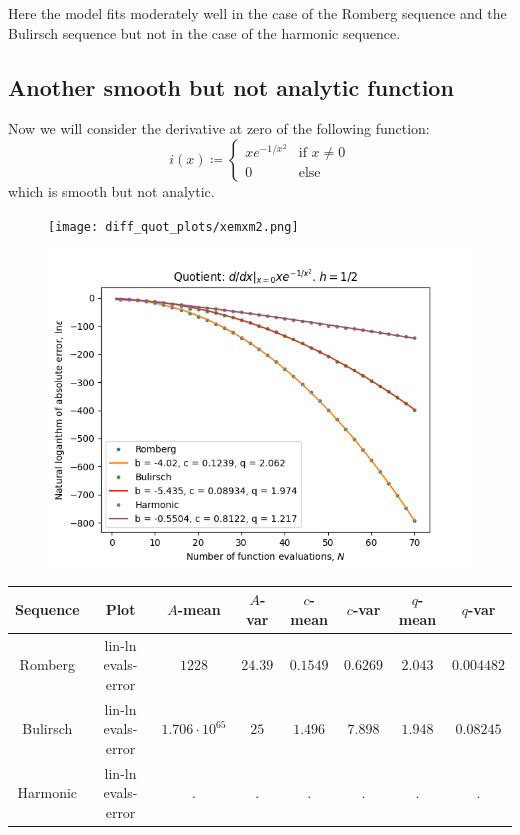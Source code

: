 Here the model fits moderately well in the case of the Romberg sequence and the Bulirsch sequence but not in the case of the harmonic sequence. 

\subsection{Another smooth but not analytic function}

Now we will consider the derivative at zero of the following function:
\[
i(x)\coloneqq \begin{cases}
xe^{-1/x^2} & \text{if } x \neq 0\\
0 & \text{else}
\end{cases}
\]
which is smooth but not analytic.
\begin{figure}[H]
\centering
\begin{minipage}{0.45\textwidth}
\centering
\texttt{[image: diff\_quot\_plots/xemxm2.png]}
\end{minipage}
\begin{minipage}{0.45\textwidth}
\centering
\includegraphics[scale=0.45]{diff_quot_plots/xemxm2_hp_trend.png}
\end{minipage}
\end{figure}

\begin{table}[H]
    \centering
    \small
    \begin{tabular}{c|c||c|c|c|c|c|c}
Sequence & Plot & \(A\)-mean & \(A\)-var & \(c\)-mean & \(c\)-var & \(q\)-mean & \(q\)-var\\\hline
Romberg & lin-ln evals-error & \(1228\) & \(24.39\) & \(0.1549\) & \(0.6269\) & \(2.043\) & \(0.004482\) \\
Bulirsch & lin-ln evals-error & \(1.706\cdot 10^{65}\) & \(25\) & \(1.496\) & \(7.898\) & \(1.948\) & \(0.08245\) \\
Harmonic & lin-ln evals-error & . & . & . & . & . & . \\
    \end{tabular}
    \label{tab:my_label}
\end{table}

